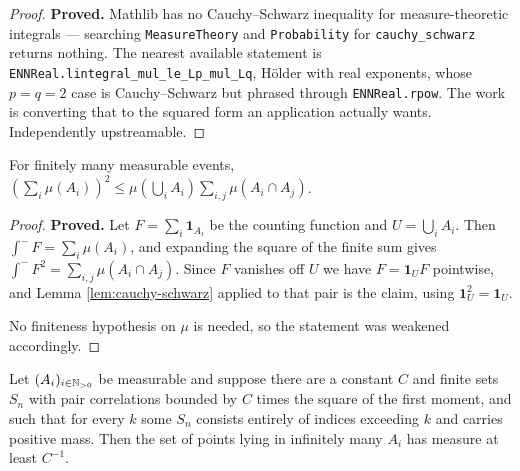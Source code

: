 \begin{proof}
  \leanok
  \textbf{Proved.} Mathlib has no Cauchy--Schwarz inequality for measure-theoretic
  integrals --- searching \texttt{MeasureTheory} and \texttt{Probability} for
  \texttt{cauchy\_schwarz} returns nothing. The nearest available statement is
  \texttt{ENNReal.lintegral\_mul\_le\_Lp\_mul\_Lq}, H\"older with real exponents, whose
  $p = q = 2$ case is Cauchy--Schwarz but phrased through \texttt{ENNReal.rpow}. The work
  is converting that to the squared form an application actually wants. Independently
  upstreamable.
\end{proof}

\begin{lemma}
  \label{lem:chung-erdos}
  \leanok
  For finitely many measurable events,
  $\left(\sum_i \mu(A_i)\right)^2 \leq \mu\!\left(\bigcup_i A_i\right) \sum_{i,j} \mu(A_i \cap A_j)$.
\end{lemma}

\begin{proof}
  \leanok
  \textbf{Proved.} Let $F = \sum_i \mathbf{1}_{A_i}$ be the counting function and
  $U = \bigcup_i A_i$. Then $\int^- F = \sum_i \mu(A_i)$, and expanding the square of the
  finite sum gives $\int^- F^2 = \sum_{i,j} \mu(A_i \cap A_j)$. Since $F$ vanishes off
  $U$ we have $F = \mathbf{1}_U F$ pointwise, and Lemma \ref{lem:cauchy-schwarz} applied
  to that pair is the claim, using $\mathbf{1}_U^2 = \mathbf{1}_U$.

  No finiteness hypothesis on $\mu$ is needed, so the statement was weakened accordingly.
\end{proof}

\begin{proposition}
  \label{prop:quasi-bc-escaping}
  \leanok
  Let $(A_i)_{i \in \mathbb{N}_{>0}}$ be measurable and suppose there are a constant $C$ and
  finite sets $S_n$ with pair correlations bounded by $C$ times the square of the first
  moment, and such that for every $k$ some $S_n$ consists entirely of indices exceeding
  $k$ and carries positive mass. Then the set of points lying in infinitely many $A_i$
  has measure at least $C^{-1}$.
\end{proposition}

